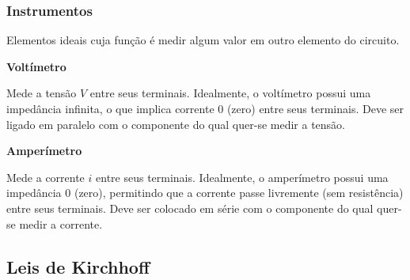 \documentclass{article}
\numberwithin{equation}{section}
\newlength\Colsep
\begin{document}
\subsubsection{Instrumentos}
\label{subsubsec:instrumentos}
Elementos ideais cuja função é medir algum valor em outro elemento do circuito.

\vspace{-1.6cm}

\noindent\begin{minipage}{\textwidth}
    \begin{minipage}[t][4.5cm]{\dimexpr0.45\textwidth-\Colsep\relax}
        \begin{center}{\textbf{Voltímetro}}\end{center}
        Mede a tensão $V$ entre seus terminais. Idealmente, o voltímetro possui uma impedância infinita\footnotemark, o que implica corrente $0$ (zero) entre seus terminais. Deve ser ligado em paralelo com o componente do qual quer-se medir a tensão.


    \end{minipage}
    \begin{minipage}[c][4.5cm]{\dimexpr0.05\textwidth-0.5\Colsep\relax}

    \end{minipage} \hfill
    \begin{minipage}[t][4.5cm]{\dimexpr0.45\textwidth-\Colsep\relax}
        \begin{center}{\textbf{Amperímetro}}\end{center}
        Mede a corrente $i$ entre seus terminais. Idealmente, o amperímetro possui uma impedância $0$ (zero), permitindo que a corrente passe livremente (sem resistência) entre seus terminais. Deve ser colocado em série com o componente do qual quer-se medir a corrente.
    \end{minipage} \hfill
\end{minipage}

\subsection{Leis de Kirchhoff}
\label{subsec:Kirchhoff}
\end{document}
